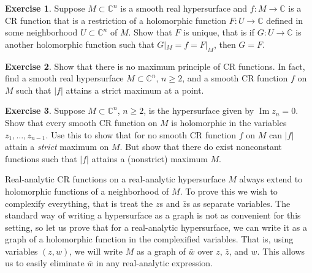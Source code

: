 \documentclass[12pt,openany]{book}
\renewcommand{\Im}{\operatorname{Im}}
\newcommand{\sabs}[1]{\lvert {#1} \rvert}
\newcommand{\C}{{\mathbb{C}}}
\theoremstyle{plain}
\theoremstyle{remark}
\theoremstyle{definition}
\newenvironment{exbox}{%
    \def\FrameCommand{\vrule width 1pt \relax\hspace{10pt}}%
    \MakeFramed {\advance \hsize -\width \FrameRestore}%
}{%
    \endMakeFramed
}
\theoremstyle{exercise}
\newtheorem{exercise}{Exercise}[section]
\theoremstyle{example}
\begin{document}
\begin{exbox}
\begin{exercise}
Suppose $M \subset \C^n$ is a smooth real hypersurface
and $f \colon M \to \C$ is a CR function that is a restriction
of a holomorphic function $F \colon U \to \C$ defined in
some neighborhood $U \subset \C^n$ of $M$.  Show that $F$ is unique,
that is if $G \colon U \to \C$ is another holomorphic function such that
$G|_M = f = F|_M$, then $G=F$.
\end{exercise}

\begin{exercise}
Show that there is no maximum principle of CR functions.  In fact, find a
smooth real hypersurface $M \subset \C^n$, $n \geq 2$, and a smooth CR function
$f$ on $M$ such that $\sabs{f}$ attains a strict maximum at a point.
\end{exercise}

\begin{exercise}
Suppose $M \subset \C^n$, $n \geq 2$, is the hypersurface given by $\Im z_n
= 0$.  Show that every smooth CR function on $M$ is holomorphic in the variables
$z_1,\ldots,z_{n-1}$.  Use this to show that for no smooth CR function $f$ on $M$ can
$\sabs{f}$ attain a \emph{strict} maximum on $M$.  But show that there do
exist nonconstant functions such that $\sabs{f}$ attains a (nonstrict) maximum $M$.
\end{exercise}
\end{exbox}

Real-analytic CR functions on a real-analytic
hypersurface $M$ always extend to holomorphic functions of a neighborhood of $M$.
To prove this we wish to complexify everything, that is treat the
$z$s and $\bar{z}$s as separate variables.  The standard way of
writing a hypersurface as a graph is not as convenient for this setting, so
let us prove that for a real-analytic hypersurface, we can write it as a
graph of a holomorphic function in the complexified variables.  That is,
using variables $(z,w)$,
we will write $M$ as a graph of $\bar{w}$ over $z$, $\bar{z}$, and $w$.
This allows us to easily eliminate $\bar{w}$ in any real-analytic
expression.
\end{document}
